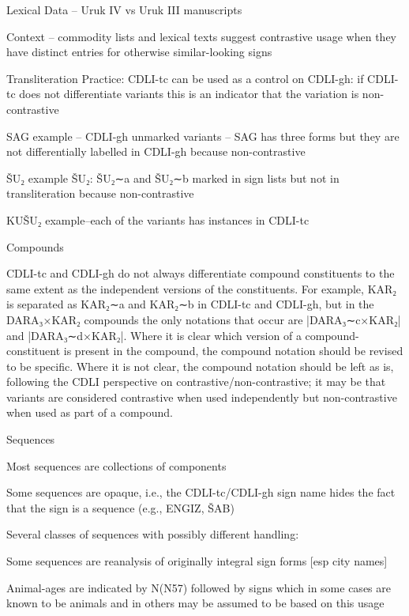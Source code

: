 \Hli{}Lexical Data -- Uruk IV vs Uruk III manuscripts

\Hli{}Context -- commodity lists and lexical texts suggest
  	contrastive usage when they have distinct entries for
  	otherwise similar-looking signs

\Hli{}Transliteration Practice:
	\Hul\Hli{}CDLI-tc can be used as a control on CDLI-gh: if CDLI-tc
  	  does not differentiate variants this is an indicator that
  	  the variation is non-contrastive

\Hli{}SAG example -- CDLI-gh unmarked variants -- SAG has
  	  three forms but they are not differentially labelled in
  	  CDLI-gh because non-contrastive

\Hli{}ŠU₂ example ŠU₂: ŠU₂∼a and ŠU₂∼b marked in sign lists
  	  but not in transliteration because non-contrastive

\Hli{}KUŠU₂ example--each of the variants has instances in CDLI-tc

\Hendul


\Hendul
\Hhhh{}Compounds


\par CDLI-tc and CDLI-gh do not always differentiate compound
      constituents to the same extent as the independent versions of
      the constituents.  For example, KAR₂ is separated as KAR₂∼a and
      KAR₂∼b in CDLI-tc and CDLI-gh, but in the DARA₃×KAR₂ compounds
      the only notations that occur are |DARA₃∼c×KAR₂| and
      |DARA₃∼d×KAR₂|.  Where it is clear which version of a
      compound-constituent is present in the compound, the compound
      notation should be revised to be specific.  Where it is not
      clear, the compound notation should be left as is, following the
      CDLI perspective on contrastive/non-contrastive; it may be that
      variants are considered contrastive when used independently but
      non-contrastive when used as part of a compound.

\Hhhh{}Sequences

\Hul\Hli{}Most sequences are collections of components

\Hli{}Some sequences are opaque, i.e., the CDLI-tc/CDLI-gh sign
	name hides the fact that the sign is a sequence (e.g., ENGIZ,
	ŠAB)

\Hli{}Several classes of sequences with possibly different handling:

	\Hul\Hli{}Some sequences are reanalysis of originally integral
	  sign forms [esp city names]

\Hli{}Animal-ages are indicated by N(N57) followed by signs
   	  which in some cases are known to be animals and in others
   	  may be assumed to be based on this usage

